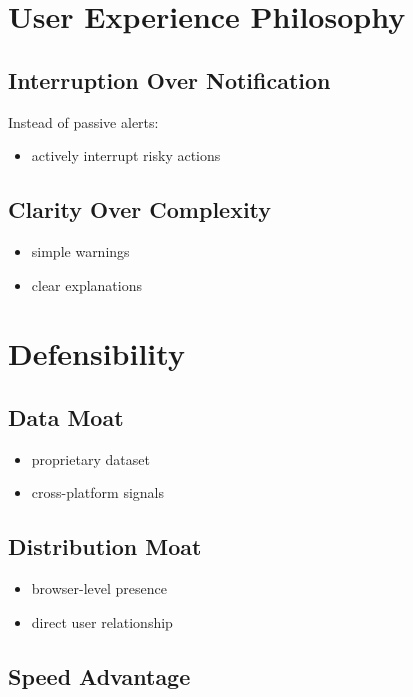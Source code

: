 \documentclass[11pt]{article}
\begin{document}
\section{User Experience Philosophy}

\subsection{Interruption Over Notification}

Instead of passive alerts:
\begin{itemize}
    \item actively interrupt risky actions
\end{itemize}

\subsection{Clarity Over Complexity}

\begin{itemize}
    \item simple warnings
    \item clear explanations
\end{itemize}

\section{Defensibility}

\subsection{Data Moat}

\begin{itemize}
    \item proprietary dataset
    \item cross-platform signals
\end{itemize}

\subsection{Distribution Moat}

\begin{itemize}
    \item browser-level presence
    \item direct user relationship
\end{itemize}

\subsection{Speed Advantage}
\end{document}

